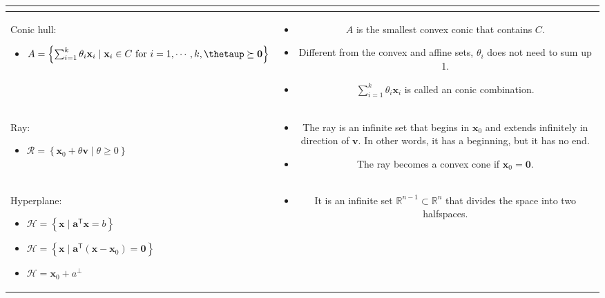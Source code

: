 \documentclass{article}
\newcommand{\trans}{\mathsf{T}}
\begin{document}
\begin{xltabular}{\textwidth}{|A|C|}
\begin{itemize}[leftmargin=*]
	\end{itemize}\\
	\hline
	Conic hull:
	\begin{itemize}[leftmargin=*]
		\item $A = \left\{ \sum_{i=1}^{k} \theta_i\mathbf{x}_i \mid \mathbf{x}_i \in C  \textnormal{ for } i=1,\cdots, k, \boldsymbol{\thetaup} \succeq \mathbf{0} \right\}$
	\end{itemize} & \vspace{-3.5ex}
	\begin{itemize}[leftmargin=*]
		\item $A$ is the smallest convex conic that contains $C$.
		\item Different from the convex and affine sets, \(\theta_i\) does not need to sum up 1.
		\item \(\sum_{i=1}^{k} \theta_i\mathbf{x}_i\) is called an conic combination.
	\end{itemize}\\
	\hline
	Ray:
	\begin{itemize}[leftmargin=*]
		\item \(\mathcal{R} = \left\{ \mathbf{x}_0 + \theta \mathbf{v} \mid \theta \geq 0 \right\}\)
	\end{itemize} & \vspace{-3.5ex} \begin{itemize}[leftmargin=*]
		\item The ray is an infinite set that begins in \(\mathbf{x}_0\) and extends infinitely in direction of \(\mathbf{v}\). In other words, it has a beginning, but it has no end.
		\item The ray becomes a convex cone if \(\mathbf{x}_0 = \mathbf{0}.\)
	\end{itemize} \\
	\hline
	Hyperplane:
	\begin{itemize}[leftmargin=*]
		\item \( \mathcal{H} = \left\{ \mathbf{x} \mid \mathbf{a}^\trans \mathbf{x} = b \right\}\)
		\item \(\mathcal{H} = \left\{ \mathbf{x} \mid \mathbf{a}^\trans (\mathbf{x} - \mathbf{x}_{0}) = \mathbf{0} \right\}\)
		\item \(\mathcal{H} = \mathbf{x}_0 + a^{\perp} \)
	\end{itemize} & \vspace{-3.5ex}
	\begin{itemize}[leftmargin=*]
		\item It is an infinite set \(\mathbb{R}^{n-1} \subset \mathbb{R}^{n}\) that divides the space into two halfspaces.

\end{itemize}
\end{xltabular}
\end{document}
